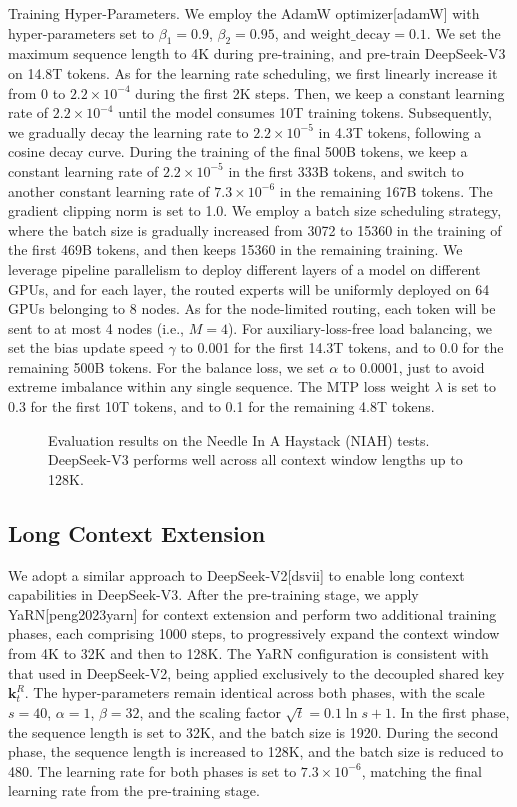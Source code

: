 \documentclass[11pt,a4paper]{article}
\begin{document}
Training Hyper-Parameters. We employ the AdamW optimizer[adamW] with hyper-parameters set to $\beta_1=0.9$, $\beta_2=0.95$, and $\mathrm{weight\_decay}=0.1$. We set the maximum sequence length to 4K during pre-training, and pre-train DeepSeek-V3 on 14.8T tokens. As for the learning rate scheduling, we first linearly increase it from 0 to $2.2 \times 10^{-4}$ during the first 2K steps. Then, we keep a constant learning rate of $2.2 \times 10^{-4}$ until the model consumes 10T training tokens. Subsequently, we gradually decay the learning rate to $2.2 \times 10^{-5}$ in 4.3T tokens, following a cosine decay curve. During the training of the final 500B tokens, we keep a constant learning rate of $2.2 \times 10^{-5}$ in the first 333B tokens, and switch to another constant learning rate of $7.3 \times 10^{-6}$ in the remaining 167B tokens. The gradient clipping norm is set to 1.0. We employ a batch size scheduling strategy, where the batch size is gradually increased from 3072 to 15360 in the training of the first 469B tokens, and then keeps 15360 in the remaining training. We leverage pipeline parallelism to deploy different layers of a model on different GPUs, and for each layer, the routed experts will be uniformly deployed on 64 GPUs belonging to 8 nodes. As for the node-limited routing, each token will be sent to at most 4 nodes (i.e., $M=4$). For auxiliary-loss-free load balancing, we set the bias update speed $\gamma$ to 0.001 for the first 14.3T tokens, and to 0.0 for the remaining 500B tokens. For the balance loss, we set $\alpha$ to 0.0001, just to avoid extreme imbalance within any single sequence. The MTP loss weight $\lambda$ is set to 0.3 for the first 10T tokens, and to 0.1 for the remaining 4.8T tokens.

\begin{figure}[h]
\caption{Evaluation results on the Needle In A Haystack (NIAH) tests. DeepSeek-V3 performs well across all context window lengths up to 128K.}
\end{figure}

\subsection{Long Context Extension}

We adopt a similar approach to DeepSeek-V2[dsvii] to enable long context capabilities in DeepSeek-V3. After the pre-training stage, we apply YaRN[peng2023yarn] for context extension and perform two additional training phases, each comprising 1000 steps, to progressively expand the context window from 4K to 32K and then to 128K. The YaRN configuration is consistent with that used in DeepSeek-V2, being applied exclusively to the decoupled shared key $\mathbf{k}^R_t$. The hyper-parameters remain identical across both phases, with the scale $s = 40$, $\alpha = 1$, $\beta = 32$, and the scaling factor $\sqrt{t} = 0.1 \ln{s} + 1$. In the first phase, the sequence length is set to 32K, and the batch size is 1920. During the second phase, the sequence length is increased to 128K, and the batch size is reduced to 480. The learning rate for both phases is set to $7.3 \times 10^{-6}$, matching the final learning rate from the pre-training stage.
\end{document}

